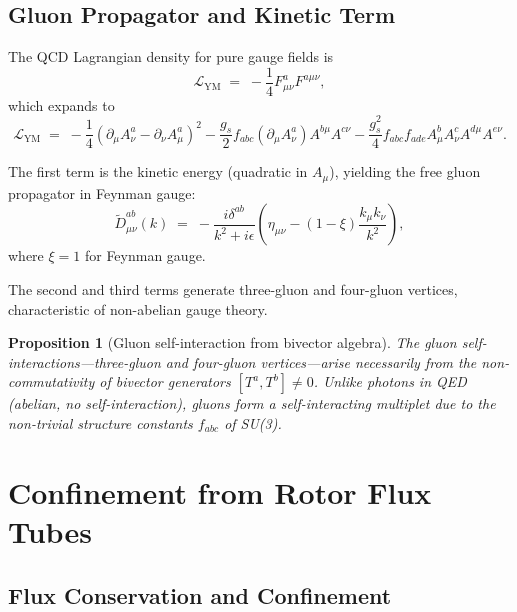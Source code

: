 \documentclass[11pt,a4paper]{article}
\newcommand{\Lag}{\mathcal{L}}
\theoremstyle{definition}
\theoremstyle{plain}
\newtheorem{proposition}{Proposition}[section]
\theoremstyle{remark}
\begin{document}
\subsection{Gluon Propagator and Kinetic Term}

The QCD Lagrangian density for pure gauge fields is
\begin{equation}
\Lag_{\mathrm{YM}} \;=\; -\frac{1}{4}F_{\mu\nu}^a F^{a\mu\nu},
\label{eq:yang-mills-lagrangian}
\end{equation}
which expands to
\begin{equation}
\Lag_{\mathrm{YM}} \;=\; -\frac{1}{4}(\partial_\mu A_\nu^a - \partial_\nu A_\mu^a)^2 - \frac{g_s}{2}f_{abc}(\partial_\mu A_\nu^a)A^{b\mu}A^{c\nu} - \frac{g_s^2}{4}f_{abc}f_{ade}A_\mu^b A_\nu^c A^{d\mu}A^{e\nu}.
\end{equation}

The first term is the kinetic energy (quadratic in $A_\mu$), yielding the free gluon propagator in Feynman gauge:
\begin{equation}
\tilde{D}_{\mu\nu}^{ab}(k) \;=\; -\frac{i\delta^{ab}}{k^2 + i\epsilon}\left(\eta_{\mu\nu} - (1-\xi)\frac{k_\mu k_\nu}{k^2}\right),
\end{equation}
where $\xi = 1$ for Feynman gauge.

The second and third terms generate three-gluon and four-gluon vertices, characteristic of non-abelian gauge theory.

\begin{proposition}[Gluon self-interaction from bivector algebra]
The gluon self-interactions---three-gluon and four-gluon vertices---arise necessarily from the non-commutativity of bivector generators $[T^a, T^b] \neq 0$. Unlike photons in QED (abelian, no self-interaction), gluons form a self-interacting multiplet due to the non-trivial structure constants $f_{abc}$ of SU(3).
\end{proposition}

\vspace{1em}

\section{Confinement from Rotor Flux Tubes}
\label{sec:confinement}

\subsection{Flux Conservation and Confinement}
\end{document}

